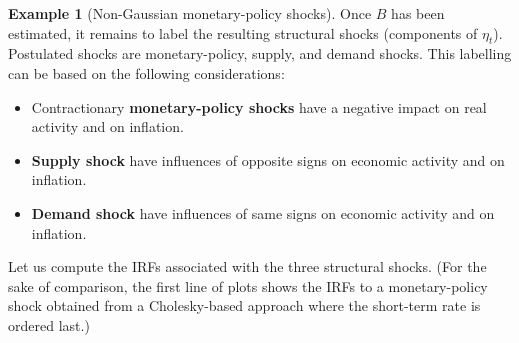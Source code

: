 \documentclass[
  12pt,
]{book}
\providecommand{\tightlist}{%
  \setlength{\itemsep}{0pt}\setlength{\parskip}{0pt}}
\theoremstyle{definition}
\theoremstyle{definition}
\newtheorem{example}{Example}[chapter]
\theoremstyle{definition}
\theoremstyle{definition}
\theoremstyle{remark}
\begin{document}
\begin{example}[Non-Gaussian monetary-policy shocks]
Once \(B\) has been estimated, it remains to label the resulting structural shocks (components of \(\eta_{t}\)). Postulated shocks are monetary-policy, supply, and demand shocks. This labelling can be based on the following considerations:

\begin{itemize}
\tightlist
\item
  Contractionary \textbf{monetary-policy shocks} have a negative impact on real activity and on inflation.
\item
  \textbf{Supply shock} have influences of opposite signs on economic activity and on inflation.
\item
  \textbf{Demand shock} have influences of same signs on economic activity and on inflation.
\end{itemize}

Let us compute the IRFs associated with the three structural shocks. (For the sake of comparison, the first line of plots shows the IRFs to a monetary-policy shock obtained from a Cholesky-based approach where the short-term rate is ordered last.)


\end{example}
\end{document}

